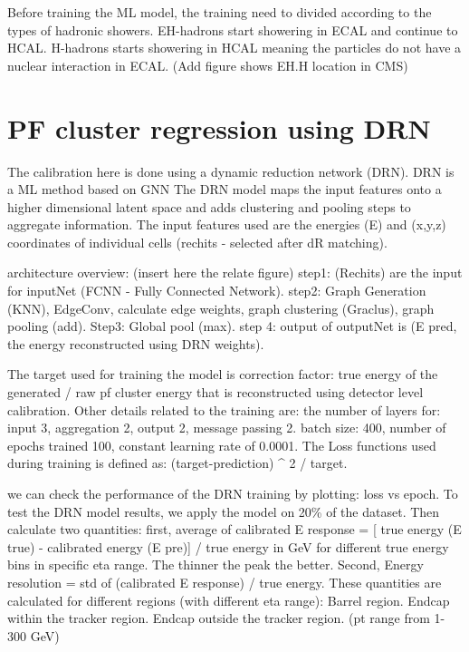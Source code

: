 Before training the ML model, the training need to divided according to the types of hadronic showers. EH-hadrons start showering in ECAL and continue to HCAL. H-hadrons starts showering in HCAL meaning the particles do not have a nuclear interaction in ECAL. (Add figure shows EH.H location in CMS)

\section{PF cluster regression using DRN}

The calibration here is done using a dynamic reduction network (DRN). DRN is a ML method based on GNN %
The DRN model maps the input features onto a higher dimensional latent space and adds clustering and pooling steps to aggregate information. The input features used are the energies (E) and (x,y,z) coordinates of individual cells (rechits - selected after dR matching).

architecture overview: (insert here the relate figure) 
step1: (Rechits) are the input for inputNet (FCNN - Fully Connected Network). 
step2:  Graph Generation (KNN), EdgeConv, calculate edge weights, graph clustering (Graclus), graph pooling (add). 
Step3: Global pool (max).  
step 4: output of outputNet is (E pred, the energy reconstructed using DRN weights).

The target used for training the model is correction factor:  true energy of the generated / raw pf cluster energy that is reconstructed using detector level calibration. Other details related to the training are: the number of layers for: input 3, aggregation 2, output 2, message passing 2. batch size: 400, number of epochs trained 100, constant learning rate of 0.0001. The Loss functions used during training is defined as: (target-prediction) ^ 2 / target.

we can check the performance of the DRN training by plotting: loss vs epoch. To test the DRN model results, we apply the model on 20\% of the dataset. Then calculate two quantities: first, average of calibrated E response = [ true energy (E true) - calibrated energy (E pre)] / true energy in GeV for different true energy bins in specific eta range. The thinner the peak the better. 
Second, Energy resolution = std of (calibrated E response) / true energy. These quantities are calculated for different regions (with different eta range): Barrel region. Endcap within the tracker region. Endcap outside the tracker region. (pt range from 1-300 GeV)

